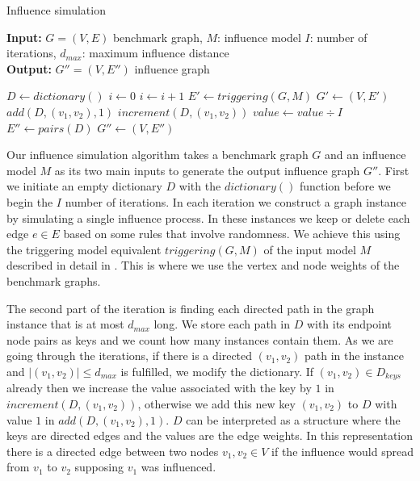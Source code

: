 \documentclass[pdflatex,sn-mathphys-num]{sn-jnl}
\begin{document}
\begin{algorithm}[ht]
\caption{Influence simulation}
\label{algo_inf_sim}
\textbf{Input:} $G = (V,E)$ benchmark graph, $M$: influence model $I$: number of iterations, $d_{max}$: maximum influence distance
\\
\textbf{Output:} $G'' = (V,E'')$ influence graph
\begin{algorithmic}[1]
    \State $D \gets dictionary()$
    \State $i \gets 0$
        \State $i \gets i + 1$
        \State $E' \gets triggering(G,M)$
        \State $G' \gets (V,E')$
                    \State $add(D,(v_1,v_2),1)$
                \Else
                    \State $increment(D,(v_1,v_2))$
                \EndIf
            \EndIf
        \EndFor
    \EndWhile
        \State $value \gets value \div I$
    \EndFor
    \State $E'' \gets pairs(D)$
    \State $G'' \gets (V,E'')$
\end{algorithmic}
\end{algorithm}

Our influence simulation algorithm takes a benchmark graph $G$ and an influence model $M$ as its two main inputs to generate the output influence graph $G''$. First we initiate an empty dictionary $D$ with the $dictionary()$ function before we begin the $I$ number of iterations. In each iteration we construct a graph instance by simulating a single influence process. In these instances we keep or delete each edge $e \in E$ based on some rules that involve randomness. We achieve this using the triggering model equivalent $triggering(G,M)$ of the input model $M$ described in detail in \cite{kempe}. This is where we use the vertex and node weights of the benchmark graphs.

The second part of the iteration is finding each directed path in the graph instance that is at most $d_{max}$ long. We store each path in $D$ with its endpoint node pairs as keys and we count how many instances contain them. As we are going through the iterations, if there is a directed $(v_1,v_2)$ path in the instance and $|(v_1,v_2)| \leq d_{max}$ is fulfilled, we modify the dictionary. If $(v_1,v_2) \in D_{keys}$ already then we increase the value associated with the key by $1$ in $increment(D,(v_1,v_2))$, otherwise we add this new key $(v_1,v_2)$ to $D$ with value $1$ in $add(D,(v_1,v_2),1)$. $D$ can be interpreted as a structure where the keys are directed edges and the values are the edge weights. In this representation there is a directed edge between two nodes $v_1,v_2 \in V$ if the influence would spread from $v_1$ to $v_2$ supposing $v_1$ was influenced.
\end{document}
